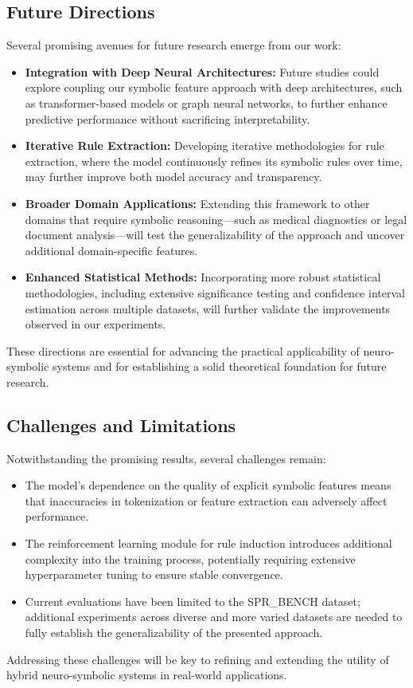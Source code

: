 \documentclass{article}
\begin{document}
\subsection{Future Directions}
Several promising avenues for future research emerge from our work:
\begin{itemize}
    \item \textbf{Integration with Deep Neural Architectures:} Future studies could explore coupling our symbolic feature approach with deep architectures, such as transformer-based models or graph neural networks, to further enhance predictive performance without sacrificing interpretability.
    \item \textbf{Iterative Rule Extraction:} Developing iterative methodologies for rule extraction, where the model continuously refines its symbolic rules over time, may further improve both model accuracy and transparency.
    \item \textbf{Broader Domain Applications:} Extending this framework to other domains that require symbolic reasoning—such as medical diagnostics or legal document analysis—will test the generalizability of the approach and uncover additional domain-specific features.
    \item \textbf{Enhanced Statistical Methods:} Incorporating more robust statistical methodologies, including extensive significance testing and confidence interval estimation across multiple datasets, will further validate the improvements observed in our experiments.
\end{itemize}
These directions are essential for advancing the practical applicability of neuro-symbolic systems and for establishing a solid theoretical foundation for future research.

\subsection{Challenges and Limitations}
Notwithstanding the promising results, several challenges remain:
\begin{itemize}
    \item The model’s dependence on the quality of explicit symbolic features means that inaccuracies in tokenization or feature extraction can adversely affect performance.
    \item The reinforcement learning module for rule induction introduces additional complexity into the training process, potentially requiring extensive hyperparameter tuning to ensure stable convergence.
    \item Current evaluations have been limited to the SPR\_BENCH dataset; additional experiments across diverse and more varied datasets are needed to fully establish the generalizability of the presented approach.
\end{itemize}
Addressing these challenges will be key to refining and extending the utility of hybrid neuro-symbolic systems in real-world applications.
\end{document}
